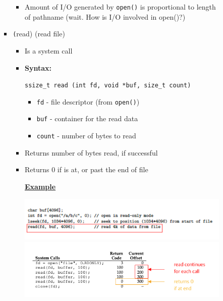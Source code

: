 \documentclass[12pt]{article}
\begin{document}
\begin{enumerate}[1.]
\begin{enumerate}
\begin{itemize}
\begin{itemize}
\begin{itemize}
                    \item Amount of I/O generated by \texttt{open()} is proportional to length
                    of pathname (wait. How is I/O involved in open()?)

                    \bigskip

                \end{itemize}

                \item \texttt(read) (read file)
                \begin{itemize}
                    \item Is a system call
                    \item \textbf{Syntax:}

                    \bigskip

                    \texttt{ssize\_t read (int fd, void *buf, size\_t count)}

                    \bigskip

                    \begin{itemize}
                        \item \texttt{fd} - file descriptor (from \texttt{open()})
                        \item \texttt{buf} - container for the read data
                        \item \texttt{count} - number of bytes to read
                    \end{itemize}
                    \item Returns number of bytes read, if successful
                    \item Returns 0 if is at, or past the end of file

                    \bigskip

                    \underline{\textbf{Example}}

                    \bigskip

                    \begin{center}
                    \includegraphics[width=\linewidth]{../images/midterm_4_solution_3.png}
                    \includegraphics[width=\linewidth]{../images/midterm_4_solution_5.png}
                    \end{center}


\end{itemize}
\end{itemize}
\end{itemize}
\end{enumerate}
\end{enumerate}
\end{document}
